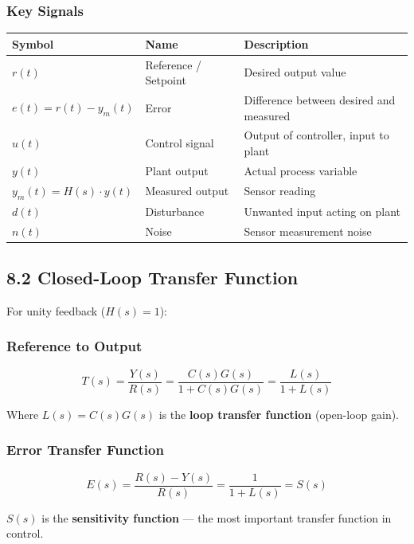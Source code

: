 \documentclass[11pt,a4paper]{book}
\begin{document}
\subsubsection{Key Signals}

\begin{center}
\begin{tabular}{|l|l|l|}
\hline
Symbol & Name & Description \\
\hline
$r(t)$ & Reference / Setpoint & Desired output value \\
$e(t) = r(t) - y_m(t)$ & Error & Difference between desired and measured \\
$u(t)$ & Control signal & Output of controller, input to plant \\
$y(t)$ & Plant output & Actual process variable \\
$y_m(t) = H(s) \cdot y(t)$ & Measured output & Sensor reading \\
$d(t)$ & Disturbance & Unwanted input acting on plant \\
$n(t)$ & Noise & Sensor measurement noise \\
\hline
\end{tabular}
\end{center}

\medskip\noindent\hrulefill\medskip

\subsection{8.2 Closed-Loop Transfer Function}

For unity feedback ($H(s) = 1$):

\subsubsection{Reference to Output}

\[\boxed{T(s) = \frac{Y(s)}{R(s)} = \frac{C(s)G(s)}{1 + C(s)G(s)} = \frac{L(s)}{1 + L(s)}}\]

Where $L(s) = C(s)G(s)$ is the \textbf{loop transfer function} (open-loop gain).

\subsubsection{Error Transfer Function}

\[\boxed{E(s) = \frac{R(s) - Y(s)}{R(s)} = \frac{1}{1 + L(s)} = S(s)}\]

$S(s)$ is the \textbf{sensitivity function} — the most important transfer function in control.
\end{document}
